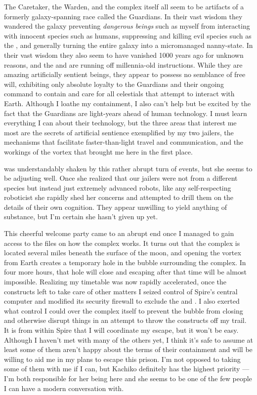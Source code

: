 \documentclass[char]{guardians}
\begin{document}
The Caretaker, the Warden, and the complex itself all seem to be artifacts of a formerly galaxy-spanning race called the Guardians. In their vast wisdom they wandered the galaxy preventing \emph{dangerous beings} such as myself from interacting with innocent species such as humans, suppressing and killing evil species such as the \evilRace{}, and generally turning the entire galaxy into a micromanaged nanny-state. In their vast wisdom they also seem to have vanished 1000 years ago for unknown reasons, and the \cCaretaker{} and \cWarden{} are running off millennia-old instructions. While they are amazing artificially sentient beings, they appear to possess no semblance of free will, exhibiting only absolute loyalty to the Guardians and their ongoing command to contain and care for all celestials that attempt to interact with Earth. Although I loathe my containment, I also can't help but be excited by the fact that the Guardians are light-years ahead of human technology. I must learn everything I can about their technology, but the three areas that interest me most are the secrets of artificial sentience exemplified by my two jailers, the mechanisms that facilitate faster-than-light travel and communication, and the workings of the vortex that brought me here in the first place.

\cKachiko{} was understandably shaken by this rather abrupt turn of events, but she seems to be adjusting well. Once she realized that our jailers were not from a different species but instead just extremely advanced robots, like any self-respecting roboticist she rapidly shed her concerns and attempted to drill them on the details of their own cognition. They appear unwilling to yield anything of substance, but I'm certain she hasn't given up yet.

This cheerful welcome party came to an abrupt end once I managed to gain access to the files on how the complex works.  It turns out that the complex is located several miles beneath the surface of the moon, and opening the vortex from Earth creates a temporary hole in the bubble surrounding the complex. In four more hours, that hole will close and escaping after that time will be almost impossible. Realizing my timetable was now rapidly accelerated, once the constructs left to take care of other matters I seized control of Spire's central computer and modified its security firewall to exclude the \cCaretaker{} and \cWarden{}. I also exerted what control I could over the complex itself to prevent the bubble from closing and otherwise disrupt things in an attempt to throw the constructs off my trail. It is from within Spire that I will coordinate my escape, but it won't be easy. Although I haven't met with many of the others yet, I think it's safe to assume at least some of them aren't happy about the terms of their containment and will be willing to aid me in my plans to escape this prison. I'm not opposed to taking some of them with me if I can, but Kachiko definitely has the highest priority --- I'm both responsible for her being here and she seems to be one of the few people I can have a modern conversation with.
\end{document}
